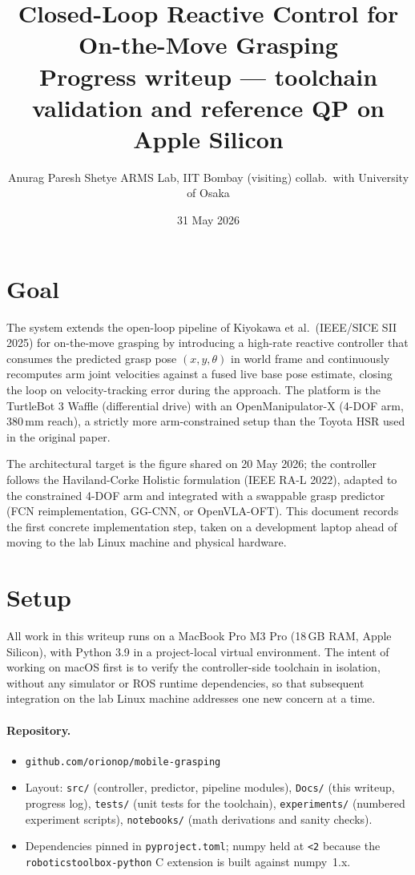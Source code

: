 \documentclass[11pt]{article}
\title{\textbf{Closed-Loop Reactive Control for On-the-Move Grasping}\\[4pt]
\large Progress writeup --- toolchain validation and reference QP on Apple Silicon}
\author{Anurag Paresh Shetye \quad\textbar\quad ARMS Lab, IIT Bombay (visiting) \quad\textbar\quad collab.\ with University of Osaka}
\date{31 May 2026}
\begin{document}
\maketitle

\section{Goal}

The system extends the open-loop pipeline of Kiyokawa et al.\
(IEEE/SICE SII 2025) for on-the-move grasping by introducing a high-rate
reactive controller that consumes the predicted grasp pose
$(x, y, \theta)$ in world frame and continuously recomputes arm joint
velocities against a fused live base pose estimate, closing the loop on
velocity-tracking error during the approach. The platform is the
TurtleBot 3 Waffle (differential drive) with an OpenManipulator-X
(4-DOF arm, $380\,$mm reach), a strictly more arm-constrained setup than
the Toyota HSR used in the original paper.

The architectural target is the figure shared on 20 May 2026; the
controller follows the Haviland-Corke Holistic formulation
(IEEE RA-L 2022), adapted to the constrained 4-DOF arm and integrated
with a swappable grasp predictor (FCN reimplementation, GG-CNN, or
OpenVLA-OFT). This document records the first concrete implementation
step, taken on a development laptop ahead of moving to the lab Linux
machine and physical hardware.

\section{Setup}

All work in this writeup runs on a MacBook Pro M3 Pro (18\,GB RAM,
Apple Silicon), with Python 3.9 in a project-local virtual environment.
The intent of working on macOS first is to verify the controller-side
toolchain in isolation, without any simulator or ROS runtime
dependencies, so that subsequent integration on the lab Linux machine
addresses one new concern at a time.

\paragraph{Repository.}
\begin{itemize}[noitemsep]
  \item \texttt{github.com/orionop/mobile-grasping}
  \item Layout: \texttt{src/} (controller, predictor, pipeline modules),
        \texttt{Docs/} (this writeup, progress log),
        \texttt{tests/} (unit tests for the toolchain),
        \texttt{experiments/} (numbered experiment scripts),
        \texttt{notebooks/} (math derivations and sanity checks).
  \item Dependencies pinned in \texttt{pyproject.toml}; numpy held at
        \texttt{<2} because the \texttt{roboticstoolbox-python} C
        extension is built against numpy~1.x.
\end{itemize}
\end{document}
